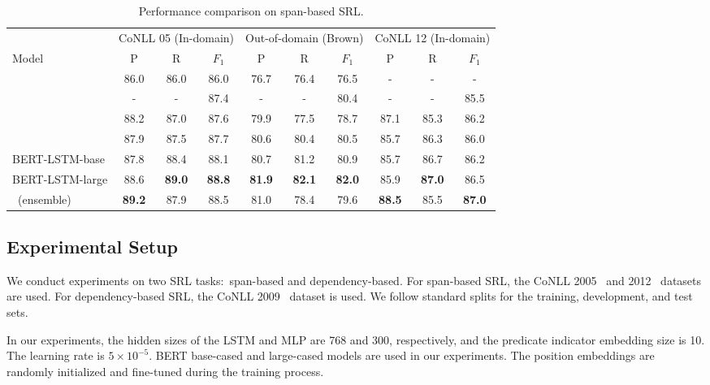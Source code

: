 \documentclass[11pt,a4paper]{article}
\begin{document}
\begin{table*}[t]
	\centering
	\small
	\begin{tabular}{l ccc ccc ccc}
		\toprule
		& \multicolumn{3}{c}{CoNLL 05 (In-domain)} &  \multicolumn{3}{c}{Out-of-domain (Brown)} & \multicolumn{3}{c}{CoNLL 12 (In-domain)}  \\ 
		\cmidrule(lr){2-4} \cmidrule(lr){5-7} \cmidrule{8-10}
		Model  & P & R & $F_1$ & P & R & $F_1$ & P & R & $F_1$ \\
		\midrule
		\citet{strubell2018linguistically} & 86.0 & 86.0 & 86.0 & 76.7 & 76.4 & 76.5  & - & - & - \\
		\citet{he2018jointly} & - & - & 87.4 & - & - & 80.4  & - & - & 85.5 \\
		\citet{ouchi2018span} & 88.2 & 87.0 & 87.6 & 79.9 & 77.5 & 78.7  &87.1 & 85.3 & 86.2 \\  
		\citet{li2019dependency}  & 87.9 & 87.5 & 87.7 & 80.6 & 80.4 & 80.5  & 85.7 & 86.3 & 86.0\\  \cmidrule{1-10}
		BERT-LSTM-base  & 87.8 & 88.4 & 88.1 & 80.7 & 81.2 & 80.9  & 85.7 & 86.7 & 86.2\\
		BERT-LSTM-large  & 88.6 & \textbf{89.0} & \textbf{88.8} & \textbf{81.9} &\textbf{82.1}&\textbf{82.0 } &  85.9 & \textbf{87.0} &  86.5\\
		\midrule
		\citet{ouchi2018span}~(ensemble)  &\textbf{89.2 }& 87.9 & 88.5 & 81.0 & 78.4 & 79.6 &  \textbf{88.5} & 85.5& \textbf{87.0}\\
		\bottomrule
	\end{tabular}
	\caption{Performance comparison on span-based SRL.}
	\label{res:conll12}
	\vspace{-1mm}
\end{table*}



\subsection{Experimental Setup}

We conduct experiments on two SRL tasks:\ span-based and dependency-based. 
For span-based SRL, the CoNLL 2005~\cite{carreras2004introduction} and 2012~\cite{pradhan2013towards} datasets are used. 
For dependency-based SRL, the CoNLL 2009~\cite{hajivc2009conll} dataset is used. 
We follow standard splits for the training, development, and test sets.

In our experiments, the hidden sizes of the LSTM and MLP are 768 and 300, respectively, and the predicate indicator embedding size is 10.
The learning rate is $5 \times 10^{-5}$.  
BERT base-cased and large-cased models are used in our experiments. 
The position embeddings are randomly initialized and fine-tuned during the training process.
\end{document}
